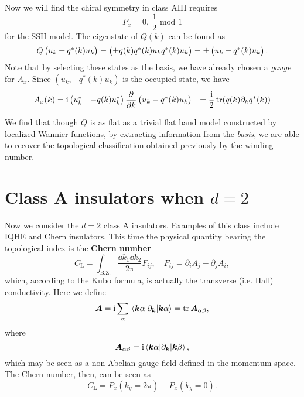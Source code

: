 \documentclass[hyperref, a4paper]{article}
\newcommand*{\ii}{\mathrm{i}}
\newcommand*{\concept}[1]{{\textbf{#1}}}
\def\\{}%
\begin{document}
Now we will find the chiral symmetry in class AIII requires 
\begin{equation}
    P_x = 0, \  \frac{1}{2} \text{ mod 1}
\end{equation}
for the SSH model. The eigenstate of $Q(k)$ can be found as 
\begin{equation}
    Q \pmqty{u_k \\ \pm q^*(k) u_k } = \pmqty{\pm q(k) q^*(k) u_k \\ q^*(k) u_k} = \pm \pmqty{u_k \\ \pm q^*(k) u_k }.
\end{equation}
Note that by selecting these states as the basis, we have already chosen a \emph{gauge} for $A_x$. 
Since $(u_k, - q^*(k) u_k)$ is the occupied state, we have 
\begin{equation}
    \begin{aligned}
        A_x(k) &= \ii \pmqty{u^*_k & - q(k) u_k^*} \pdv{k} \pmqty{u_k \\ - q^*(k) u_k}  \\
        &= \frac{\ii}{2} \trace (q(k) \partial_k q^*(k)) 
    \end{aligned}
\end{equation}

We find that though $Q$ is as flat as a trivial flat band model constructed by localized Wannier functions, 
by extracting information from the \emph{basis}, we are able to recover the topological classification obtained 
previously by the winding number.

\section{Class A insulators when $d=2$}

Now we consider the $d=2$ class A insulators. Examples of this class include IQHE and Chern insulators.
This time the physical quantity bearing the topological index is the \concept{Chern number}
\begin{equation}
    C_\text{L} = \int_\text{B.Z.} \frac{\dd{k_1} \dd{k_2}}{2 \pi} F_{ij}, \quad F_{ij} = \partial_i A_j - \partial_j A_i,
\end{equation}
which, according to the Kubo formula, is actually the transverse (i.e. Hall) conductivity. 
Here we define 
\begin{equation}
    \vb*{A} = \ii \sum_\alpha \mel{\vb*{k} \alpha}{\partial_{\vb*{k}}}{\vb*{k} \alpha} = \trace \vb*{A}_{\alpha \beta},
\end{equation}
where 
\begin{equation}
    \vb*{A}_{\alpha \beta} = \ii \mel{\vb*{k} \alpha}{\partial_{\vb*{k}}}{\vb*{k} \beta},
\end{equation}
which may be seen as a non-Abelian gauge field defined in the momentum space. 
The Chern-number, then, can be seen as 
\begin{equation}
    C_\text{L} = P_x(k_y = 2\pi) - P_x(k_y = 0).
\end{equation}
\end{document}
